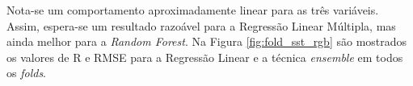 \begin{figure}[H]
\end{figure}

Nota-se um comportamento aproximadamente linear para as três variáveis. Assim, espera-se um resultado razoável para a Regressão Linear Múltipla, mas ainda melhor para a \textit{Random Forest}. Na Figura \ref{fig:fold_sst_rgb} são mostrados os valores de R e RMSE para a Regressão Linear e a técnica \textit{ensemble} em todos os \textit{folds}.

